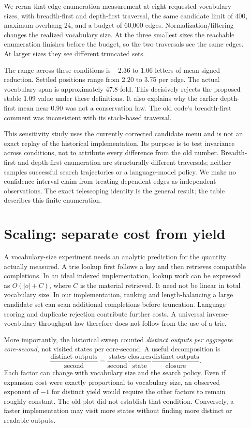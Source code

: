 \documentclass[11pt,letterpaper]{article}
\newcommand{\pageend}{\clearpage}
\begin{document}
We reran that edge-enumeration measurement at eight requested vocabulary sizes, with breadth-first and depth-first traversal, the same candidate limit of 400, maximum overhang 24, and a budget of 60,000 edges. Normalization/filtering changes the realized vocabulary size. At the three smallest sizes the reachable enumeration finishes before the budget, so the two traversals see the same edges. At larger sizes they see different truncated sets.



The range across these conditions is $-2.36$ to $1.06$ letters of mean signed reduction. Settled positions range from 2.20 to 3.75 per edge. The actual vocabulary span is approximately 47.8-fold. This decisively rejects the proposed stable 1.09 value under these definitions. It also explains why the earlier depth-first mean near 0.90 was not a conservation law. The old code's breadth-first comment was inconsistent with its stack-based traversal.

This sensitivity study uses the currently corrected candidate menu and is not an exact replay of the historical implementation. Its purpose is to test invariance across conditions, not to attribute every difference from the old number. Breadth-first and depth-first enumeration are structurally different traversals; neither samples successful search trajectories or a language-model policy. We make no confidence-interval claim from treating dependent edges as independent observations. The exact telescoping identity is the general result; the table describes this finite enumeration.
\pageend

\section{Scaling: separate cost from yield}
\label{sec:scaling}
A vocabulary-size experiment needs an analytic prediction for the quantity actually measured. A trie lookup first follows a key and then retrieves compatible completions. In an ideal indexed implementation, lookup work can be expressed as $O(|o|+C)$, where $C$ is the material retrieved. It need not be linear in total vocabulary size. In our implementation, ranking and length-balancing a large candidate set can scan additional completions before truncation. Language scoring and duplicate rejection contribute further costs. A universal inverse-vocabulary throughput law therefore does not follow from the use of a trie.

More importantly, the historical sweep counted \emph{distinct outputs per aggregate core-second}, not visited states per core-second. A useful decomposition is
\[
 \frac{\text{distinct outputs}}{\text{second}}
 =\frac{\text{states}}{\text{second}}
  \frac{\text{closures}}{\text{state}}
  \frac{\text{distinct outputs}}{\text{closure}}.
\]
Each factor can change with vocabulary size and the search policy. Even if expansion cost were exactly proportional to vocabulary size, an observed exponent of $-1$ for distinct yield would require the other factors to remain roughly constant. The old plot did not establish that condition. Conversely, a faster implementation may visit more states without finding more distinct or readable outputs.
\end{document}
